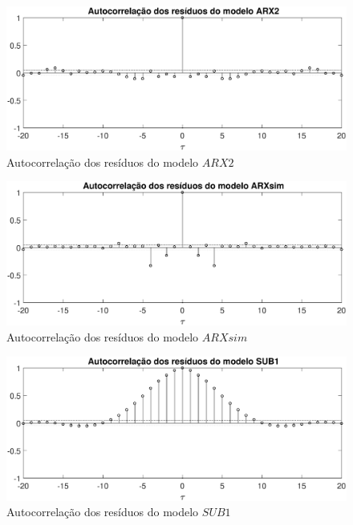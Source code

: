 \begin{figure}[htb]
	\centering
	\includegraphics[width=1\linewidth]{autocorrelacaoARX2}
	\caption[Autocorrelação dos resíduos do modelo $ARX2$]{Autocorrelação dos resíduos do modelo $ARX2$}
	\label{fig:autocorrelacaoARX2}
\end{figure}

\begin{figure}[htb]
	\centering
	\includegraphics[width=1\linewidth]{autocorrelacaoARXsim}
	\caption[Autocorrelação dos resíduos do modelo $ARXsim$]{Autocorrelação dos resíduos do modelo $ARXsim$}
	\label{fig:autocorrelacaoarxsim}
\end{figure}

\begin{figure}[htb]
	\centering
	\includegraphics[width=1\linewidth]{autocorrelacaosub1}
	\caption[Autocorrelação dos resíduos do modelo $SUB1$]{Autocorrelação dos resíduos do modelo $SUB1$}
	\label{fig:autocorrelacaosub1}
\end{figure}

